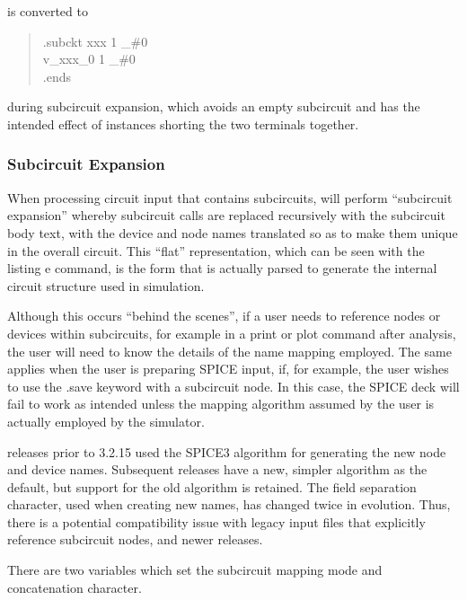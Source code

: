 is converted to
\begin{quote}
{\vt .subckt xxx 1 \_\#0\\
 v\_xxx\_0 1 \_\#0\\
 .ends}
\end{quote}
during subcircuit expansion, which avoids an empty subcircuit and
has the intended effect of instances shorting the two terminals
together.

\subsubsection{Subcircuit Expansion}
\label{subexpand}

When processing circuit input that contains subcircuits, {\WRspice}
will perform ``subcircuit expansion'' whereby subcircuit calls are
replaced recursively with the subcircuit body text, with the device
and node names translated so as to make them unique in the overall
circuit.  This ``flat'' representation, which can be seen with the
{\cb listing e} command, is the form that is actually parsed to
generate the internal circuit structure used in simulation.

Although this occurs ``behind the scenes'', if a user needs to
reference nodes or devices within subcircuits, for example in a {\cb
print} or {\cb plot} command after analysis, the user will need to
know the details of the name mapping employed.  The same applies when
the user is preparing SPICE input, if, for example, the user wishes to
use the {\vt .save} keyword with a subcircuit node.  In this case, the
SPICE deck will fail to work as intended unless the mapping algorithm
assumed by the user is actually employed by the simulator.

{\WRspice} releases prior to 3.2.15 used the SPICE3 algorithm for
generating the new node and device names.  Subsequent releases have a
new, simpler algorithm as the default, but support for the old
algorithm is retained.  The field separation character, used when
creating new names, has changed twice in {\WRspice} evolution.  Thus,
there is a potential compatibility issue with legacy {\WRspice} input
files that explicitly reference subcircuit nodes, and newer {\WRspice}
releases.

There are two variables which set the subcircuit mapping mode and
concatenation character.

